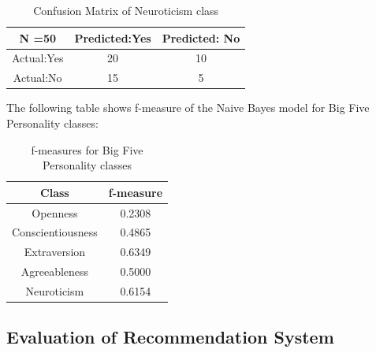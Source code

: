 \documentclass[journal]{IEEEtran}
\begin{document}
\FloatBarrier
\begin{table}[H]
\centering
 \caption{Confusion Matrix of Neuroticism class}

\begin{tabular}{ |c|c|c| }
 \hline
 N =50 & Predicted:Yes & Predicted: No \\
 \hline
 Actual:Yes&20 & 10 \\
 \hline
 Actual:No&15 & 5 \\
 \hline
\end{tabular}
\end{table}

The following table shows f-measure of the Naive Bayes model for Big Five Personality classes:
\FloatBarrier
\begin{table}[H]
\centering
 \caption{f-measures for Big Five Personality classes}

\begin{tabular}{ |c|c| }
 \hline
 Class & f-measure \\
 \hline
 Openness&0.2308\\
 \hline
 Conscientiousness&0.4865 \\
 \hline
 Extraversion&0.6349 \\
 \hline
 Agreeableness&0.5000 \\
 \hline
 Neuroticism&0.6154 \\
 \hline
\end{tabular}
\end{table}

\subsection{Evaluation of Recommendation System}
\end{document}
